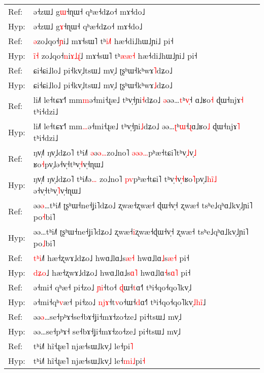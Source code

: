 \documentclass[10pt]{article}
\DeclareRobustCommand{\hl}[1]{{\textcolor{red}{#1}}}
\begin{document}
\begin{longtable}{ll}
\midrule 
Ref: & ə˧zɯ˩ g\hl{ɯ}˧ɳɯ˧ qʰæ˧dʑo˧ mɤ˧do˩ \\ 
Hyp: & ə˧zɯ˩ g\hl{ɤ}˧ɳɯ˧ qʰæ˧dʑo˧ mɤ˧do˩ \\ 
\midrule 
Ref: & \hl{ə}zo˩qo˧\hl{ɲ}i˩ mɤ˧sɯ˥ tʰ\hl{i}\hl{˩}\hl{˥} hæ˧di˩hɯ˩ɲi˩ pi˧ \\ 
Hyp: & \hl{i}\hl{̃}\hl{˧}\hl{ }zo˩qo˧\hl{n}i\hl{ɤ}\hl{˩}\hl{ɻ}\hl{̍}˩ mɤ˧sɯ˥ tʰ\hl{æ}\hl{æ}\hl{˧} hæ˧di˩hɯ˩ɲi˩ pi˧ \\ 
\midrule 
Ref: & ɕi˧ɕi˩lo˩ pi˧kv̩˩tsɯ˩ mv̩˩ ʈʂʰɯ˧kʰwɤ\hl{˥}dʑo˩ \\ 
Hyp: & ɕi˧ɕi˩lo˩ pi˧kv̩˩tsɯ˩ mv̩˩ ʈʂʰɯ˧kʰwɤ\hl{˩}dʑo˩ \\ 
\midrule 
Ref: & li˩˥ le˧tɕɤ˧˥ mm\hl{m}ə˧mi˧ɻæ˩ tʰv̩˧ɲi\hl{˧}dʑo˩ \hl{ə}əə…\hl{t}ʰ\hl{v}\hl{̩}˧\hl{ }ɑ˩ʁo\hl{˧} ɖɯ˧njɤ\hl{˧} tʰi˧dzi˩ \\ 
Hyp: & li˩˥ le˧tɕɤ˧˥ mm\hl{…}ə˧mi˧ɻæ˩ tʰv̩˧ɲi\hl{˩}dʑo˩ əə…\hl{ʈ}ʰ\hl{ɯ}˧\hl{ɻ}ɑ˩ʁo\hl{˩} ɖɯ˧njɤ\hl{˥} tʰi˧dzi˩ \\ 
\midrule 
Ref: & ŋv̩˩˥ ŋv̩˩dʑo˥ tʰi˩˥\hl{ }\hl{ə}ə\hl{ə}\hl{…}zo˩no˥ \hl{ə}\hl{ə}\hl{ə}\hl{…}pʰæ˧tɕi˥tʰv̩\hl{˩}v̩\hl{˩}\hl{ }ʁo\hl{˧}pv̩˩ə˧v̩˧tʰv̩\hl{˧}v̩˧ɳɯ˩ \\ 
Hyp: & ŋv̩˩˥ ŋv̩˩dʑo˥ tʰi˩˥ə\hl{…}\hl{ }zo˩no˥ \hl{p}\hl{v}pʰæ˧tɕi˥\hl{ }tʰv̩\hl{˧}v̩\hl{˧}ʁo\hl{˥}pv̩˩\hl{h}\hl{i}\hl{̃}\hl{˩}\hl{ }ə˧v̩˧tʰv̩\hl{˥}v̩˧ɳɯ˩ \\ 
\midrule 
Ref: & əə\hl{ə}…tʰi˩˥ ʈʂʰɯ˧ne˧ʝi˥dʑo˩ ʐwæ˧ʐwæ˧\hl{ }ɖɯ˧v̩˧ ʐwæ˧ tsʰe˩qʰɑ˩kv̩˩ɲi˥ po\hl{˧}bi˥ \\ 
Hyp: & əə…tʰi˩˥ ʈʂʰɯ˧ne˧ʝi˥dʑo˩ ʐwæ˧\hl{i}ʐwæ˧ɖɯ˧v̩˧ ʐwæ˧ tsʰe˩qʰɑ˩kv̩˩ɲi˥ po\hl{˩}bi˥ \\ 
\midrule 
Ref: & \hl{t}\hl{ʰ}\hl{i}˩\hl{˥} hæ˧ʐwɤ˩dʑo˩ hwɑ˩lɑ˩s\hl{æ}\hl{˧} hwɑ˩lɑ\hl{˩}s\hl{æ}\hl{˧} pi˧ \\ 
Hyp: & \hl{d}\hl{ʑ}\hl{o}˩ hæ˧ʐwɤ˩dʑo˩ hwɑ˩lɑ˩s\hl{ɑ}\hl{˥} hwɑ˩lɑ\hl{˧}s\hl{ɑ}\hl{˥} pi˧ \\ 
\midrule 
Ref: & ə˧mi˧\hl{ }qʰæ˧ pi˧zo˩ \hl{ɲ}\hl{i}˧to˧\hl{ }\hl{ɖ}ɯ˧\hl{t}ɑ˧˥ tʰi˧qo˧qo˥kv̩˩ \\ 
Hyp: & ə˧mi˧qʰ\hl{v}æ˧ pi˧zo˩ \hl{n}\hl{j}\hl{ɤ}˧t\hl{v}o˧ɯ˧\hl{d}ɑ˧˥ tʰi˧qo˧qo˥kv̩\hl{˩}\hl{h}\hl{i}\hl{̃}˩ \\ 
\midrule 
Ref: & əə\hl{ə}…se˧pʰɤ˧se˧bɤ˧ʝi˧mɤ˧zo˧ze˩ pi˧tsɯ˩ mv̩˩ \\ 
Hyp: & əə…se˧pʰɤ˧\hl{ }se˧bɤ˧ʝi˧mɤ˧zo˧ze˩ pi˧tsɯ˩ mv̩˩ \\ 
\midrule 
Ref: & tʰi˩˥ hĩ˧ɻæ˥ njæ˧sɯ˩kv̩˩ le˧pi\hl{˥} \\ 
Hyp: & tʰi˩˥ hĩ˧ɻæ˥ njæ˧sɯ˩kv̩˩ le˧\hl{m}\hl{i}\hl{˩}pi\hl{˧} \\ 

\end{longtable}
\end{document}

